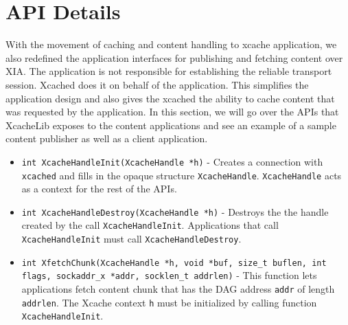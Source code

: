 \section{API Details}
\label{sec:apis}
With the movement of caching and content handling to xcache
application, we also redefined the application interfaces for
publishing and fetching content over XIA. The application is not
responsible for establishing the reliable transport session. Xcached
does it on behalf of the application. This simplifies the application
design and also gives the xcached the ability to cache content that
was requested by the application. In this section, we will go over the
APIs that XcacheLib exposes to the content applications and see an
example of a sample content publisher as well as a client application.
\begin{itemize}
\item{\texttt{int XcacheHandleInit(XcacheHandle *h)}} - Creates a
  connection with \texttt{xcached} and fills in the opaque structure
  \texttt{XcacheHandle}. \texttt{XcacheHandle} acts as a context for
  the rest of the APIs.
\item{\texttt{int XcacheHandleDestroy(XcacheHandle *h)}} - Destroys
  the the handle created by the call
  \texttt{XcacheHandleInit}. Applications that call
  \texttt{XcacheHandleInit} must call \texttt{XcacheHandleDestroy}.
\item{\texttt{int XfetchChunk(XcacheHandle *h, void *buf, size\_t buflen,
    int flags, sockaddr\_x *addr, socklen\_t addrlen)}} - This
  function lets applications fetch content chunk that has the DAG
  address \texttt{addr} of length \texttt{addrlen}. The Xcache context
  \texttt{h} must be initialized by calling function
  \texttt{XcacheHandleInit}.


\end{itemize}
